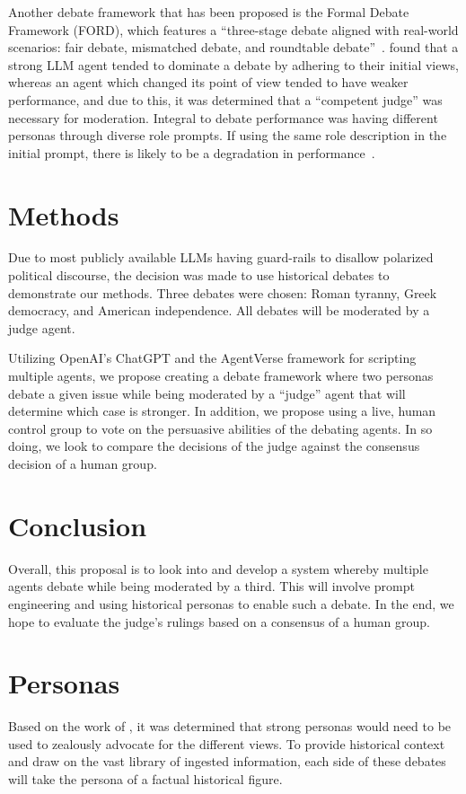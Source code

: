 \documentclass[jair,twoside,11pt,theapa]{article}
\begin{document}
Another debate framework that has been proposed is the Formal Debate Framework (FORD), which features a ``three-stage debate aligned with real-world scenarios: fair debate, mismatched debate, and roundtable debate''~.   found that a strong LLM agent tended to dominate a debate by adhering to their initial views, whereas an agent which changed its point of view tended to have weaker performance, and due to this, it was determined that a ``competent judge'' was necessary for moderation.  Integral to debate performance was having different personas through diverse role prompts.  If using the same role description in the initial prompt, there is likely to be a degradation in performance~.

\section{Methods}
Due to most publicly available LLMs having guard-rails to disallow polarized political discourse, the decision was made to use historical debates to demonstrate our methods.  Three debates were chosen: Roman tyranny, Greek democracy, and American independence.  All debates will be moderated by a judge agent.

Utilizing OpenAI's ChatGPT and the AgentVerse framework for scripting multiple agents, we propose creating a debate framework where two personas debate a given issue while being moderated by a ``judge'' agent that will determine which case is stronger.  In addition, we propose using a live, human control group to vote on the persuasive abilities of the debating agents.  In so doing, we look to compare the decisions of the judge against the consensus decision of a human group.


\section{Conclusion}
Overall, this proposal is to look into and develop a system whereby multiple agents debate while being moderated by a third.  This will involve prompt engineering and using historical personas to enable such a debate.  In the end, we hope to evaluate the judge's rulings based on a consensus of a human group.

\vskip 0.2in



\appendix
\section{Personas}
Based on the work of , it was determined that strong personas would need to be used to zealously advocate for the different views.  To provide historical context and draw on the vast library of ingested information, each side of these debates will take the persona of a factual historical figure.
\end{document}
